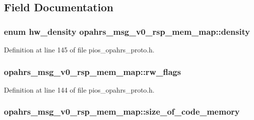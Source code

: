 \subsection{Field Documentation}
\hypertarget{structopahrs__msg__v0__rsp__mem__map_a7dcccdb376ffb76d6f8c7f84f147fc0e}{
\subsubsection[{density}]{\setlength{\rightskip}{0pt plus 5cm}enum {\bf hw\-\_\-density} opahrs\-\_\-msg\-\_\-v0\-\_\-rsp\-\_\-mem\-\_\-map\-::density}}\label{structopahrs__msg__v0__rsp__mem__map_a7dcccdb376ffb76d6f8c7f84f147fc0e}


Definition at line 145 of file pios\-\_\-opahrs\-\_\-proto.\-h.

\hypertarget{structopahrs__msg__v0__rsp__mem__map_af6e70c1a9b8089db3e82b566281f042a}{
\subsubsection[{rw\-\_\-flags}]{ opahrs\-\_\-msg\-\_\-v0\-\_\-rsp\-\_\-mem\-\_\-map\-::rw\-\_\-flags}}\label{structopahrs__msg__v0__rsp__mem__map_af6e70c1a9b8089db3e82b566281f042a}


Definition at line 144 of file pios\-\_\-opahrs\-\_\-proto.\-h.

\hypertarget{structopahrs__msg__v0__rsp__mem__map_ad4f10c0d7e3ddaf4e3ae632c86d1a81a}{
\subsubsection[{size\-\_\-of\-\_\-code\-\_\-memory}]{ opahrs\-\_\-msg\-\_\-v0\-\_\-rsp\-\_\-mem\-\_\-map\-::size\-\_\-of\-\_\-code\-\_\-memory}}\label{structopahrs__msg__v0__rsp__mem__map_ad4f10c0d7e3ddaf4e3ae632c86d1a81a}


